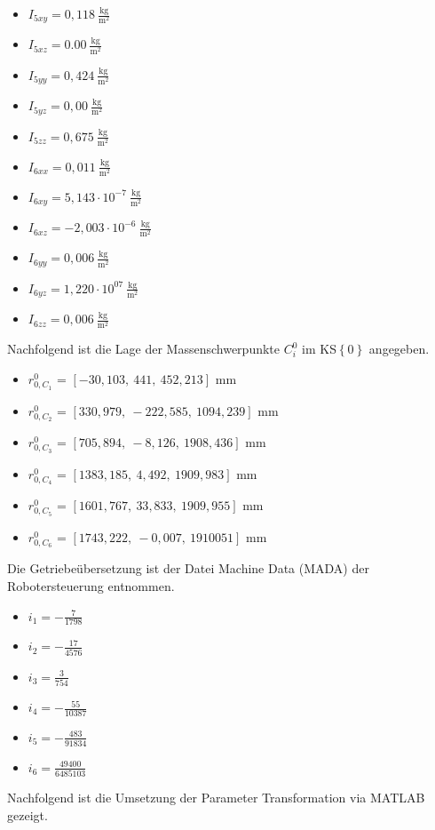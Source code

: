 \begin{itemize}
	\item $I_{5xy} = 0,118~\frac{\text{kg}}{\text{m}^2}$
	\item $I_{5xz} = 0.00~\frac{\text{kg}}{\text{m}^2}$
	\item $I_{5yy} = 0,424~\frac{\text{kg}}{\text{m}^2}$
	\item $I_{5yz} = 0,00~\frac{\text{kg}}{\text{m}^2}$
	\item $I_{5zz} = 0,675~\frac{\text{kg}}{\text{m}^2}$
	\\
	\item $I_{6xx} = 0,011~\frac{\text{kg}}{\text{m}^2}$
	\item $I_{6xy} = 5,143\cdot10^{-7}~\frac{\text{kg}}{\text{m}^2}$
	\item $I_{6xz} = -2,003\cdot10^{-6}~\frac{\text{kg}}{\text{m}^2}$
	\item $I_{6yy} = 0,006~\frac{\text{kg}}{\text{m}^2}$
	\item $I_{6yz} = 1,220\cdot10^{07}~\frac{\text{kg}}{\text{m}^2}$
	\item $I_{6zz} = 0,006~\frac{\text{kg}}{\text{m}^2}$
\end{itemize}
%
Nachfolgend ist die Lage der Massenschwerpunkte $C_i^0$ im KS$\left\{0\right\}$ angegeben. 
% 
\begin{itemize}
	\item $r_{0,C_1}^0$ = $\left[-30,103,~441,~452,213\right]$ mm
	\item $r_{0,C_2}^0$ = $\left[330,979,~-222,585,~1094,239\right]$ mm
	\item $r_{0,C_3}^0$ = $\left[705,894,~-8,126,~1908,436\right]$ mm
	\item $r_{0,C_4}^0$ = $\left[1383,185,~4,492,~1909,983\right]$ mm
	\item $r_{0,C_5}^0$ = $\left[1601,767,~33,833,~1909,955\right]$ mm
	\item $r_{0,C_6}^0$ = $\left[1743,222,~-0,007,~1910 051\right]$ mm
\end{itemize}
%
Die Getriebeübersetzung ist der Datei Machine Data (MADA) der Robotersteuerung entnommen.
%
\begin{itemize}
	\item $i_1 = -\frac{7}{1798}$
	\item $i_2 = -\frac{17}{4576}$
	\item $i_3 = \frac{3}{754}$
	\item $i_4 = -\frac{55}{10387}$
	\item $i_5 = -\frac{483}{91834}$
	\item $i_6 = \frac{49400}{6485103}$
\end{itemize}
Nachfolgend ist die Umsetzung der Parameter Transformation via MATLAB\textsuperscript{\textregistered} gezeigt. 
%

%
\setcounter{chapter}{2}
\setcounter{section}{3}
\setcounter{table}{0}
\setcounter{figure}{0}
%
